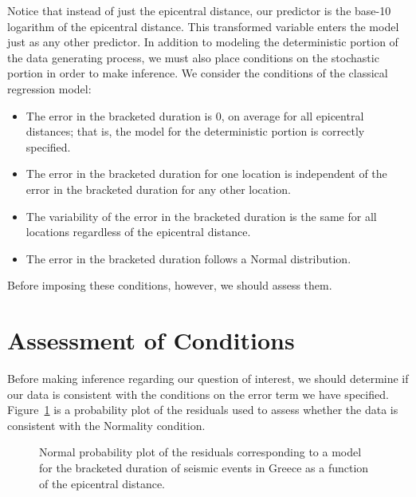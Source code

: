\documentclass[
  letterpaper,
  DIV=11,
  numbers=noendperiod]{scrreprt}
\providecommand{\tightlist}{%
  \setlength{\itemsep}{0pt}\setlength{\parskip}{0pt}}\usepackage{longtable,booktabs,array}
\theoremstyle{plain}
\theoremstyle{definition}
\theoremstyle{definition}
\theoremstyle{remark}
\begin{document}
Notice that instead of just the epicentral distance, our predictor is
the base-10 logarithm of the epicentral distance. This transformed
variable enters the model just as any other predictor. In addition to
modeling the deterministic portion of the data generating process, we
must also place conditions on the stochastic portion in order to make
inference. We consider the conditions of the classical regression model:

\begin{itemize}
\tightlist
\item
  The error in the bracketed duration is 0, on average for all
  epicentral distances; that is, the model for the deterministic portion
  is correctly specified.
\item
  The error in the bracketed duration for one location is independent of
  the error in the bracketed duration for any other location.
\item
  The variability of the error in the bracketed duration is the same for
  all locations regardless of the epicentral distance.
\item
  The error in the bracketed duration follows a Normal distribution.
\end{itemize}

Before imposing these conditions, however, we should assess them.

\section{Assessment of Conditions}\label{assessment-of-conditions}

Before making inference regarding our question of interest, we should
determine if our data is consistent with the conditions on the error
term we have specified. Figure~\ref{fig-regrecap-normality} is a
probability plot of the residuals used to assess whether the data is
consistent with the Normality condition.

\begin{figure}


\caption{\label{fig-regrecap-normality}Normal probability plot of the
residuals corresponding to a model for the bracketed duration of seismic
events in Greece as a function of the epicentral distance.}

\end{figure}%
\end{document}
